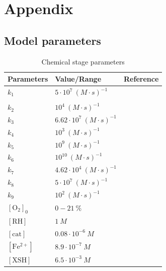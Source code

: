 \documentclass[10pt]{iopart}
\numberwithin{table}{section}
\begin{document}

\cleardoublepage



\appendix

\section*{Appendix}
\subsection*{Model parameters}

\begin{table}[h]%
\centering
\caption{Chemical stage parameters}\label{TAB:chempar}
\begin{tabular}{llr}
\textbf{Parameters} & \textbf{Value/Range} & \textbf{Reference} \\
\midrule
    $k_1$ & $5 \cdot 10^7 ~(M \cdot s)^{-1}$ & \cite{Labarbe2020, Spitz2019} \\
          & & \cite{ Neta1990, Epp1976, Michael1986}\\
    $k_2$ & $10^4 ~(M \cdot s)^{-1}$ & \cite{Labarbe2020, Riahi2010} \\
    $k_3$ & $6.62 \cdot 10^7 ~(M \cdot s)^{-1}$ & \cite{Labarbe2020} \\
    $k_4$ & $10^3 ~(M \cdot s)^{-1}$ & \cite{Labarbe2020} \\
    $k_5$ & $10^9 ~(M \cdot s)^{-1}$ & \cite{Labarbe2020} \\
    $k_6$ & $10^10 ~(M \cdot s)^{-1}$ & \cite{Labarbe2020} \\
    $k_7$ & $4.62 \cdot 10^4 ~(M \cdot s)^{-1}$ & \cite{Labarbe2020} \\
    $k_8$ & $5 \cdot 10^7 ~(M \cdot s)^{-1}$ & \cite{Labarbe2020} \\
    $k_{9}$ & $10^2 ~(M \cdot s)^{-1}$ & \cite{Spitz2019, Wardman2020} \\
    $[\mathrm{O_2}]_0$ & $0-21 ~\%$ & \cite{Adrian2020, Tessonnier2021, Tinganelliinvitro2022} \\
    $[\mathrm{RH}]$ & $1 ~M$ & \cite{Labarbe2020} \\
    $[\mathrm{cat}]$ & $0.08 \cdot 10^{-6} ~M$ & \cite{Labarbe2020} \\
    $[\mathrm{Fe^{2+}}]$ & $8.9 \cdot 10^{-7} ~M$ & \cite{Labarbe2020} \\
    $[\mathrm{XSH}]$ & $6.5 \cdot 10^{-3} ~M$ & \cite{Labarbe2020} \\
\bottomrule
\end{tabular}
\end{table}
\end{document}
